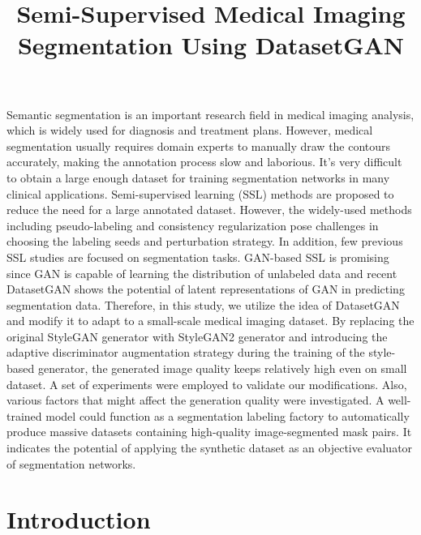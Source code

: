 \documentclass[conference]{IEEEtran}
\title{Semi-Supervised Medical Imaging Segmentation Using DatasetGAN}
\author{\IEEEauthorblockN{Zong Fan}
\IEEEauthorblockA{\textit{Dept. Bioengineering}, UIUC \\
zongfan2@illinois.edu}
}
\begin{document}
\maketitle

\vspace{-0.5cm}
\begin{abstract}
\maketitle

\end{abstract}
Semantic segmentation is an important research field in medical imaging analysis, which is widely used for diagnosis and treatment plans. However, medical segmentation usually requires domain experts to manually draw the contours accurately, making the annotation process slow and laborious. It's very difficult to obtain a large enough dataset for training segmentation networks in many clinical applications.  
Semi-supervised learning (SSL) methods are proposed to reduce the need for a large annotated dataset. However, the widely-used methods including pseudo-labeling and consistency regularization pose challenges in choosing the labeling seeds and perturbation strategy. 
In addition, few previous SSL studies are focused on segmentation tasks. GAN-based SSL is promising since GAN is capable of learning the distribution of unlabeled data and recent DatasetGAN shows the potential of latent representations of GAN in predicting segmentation data. 
Therefore, in this study, we utilize the idea of DatasetGAN and modify it to adapt to a small-scale medical imaging dataset. 
By replacing the original StyleGAN generator with StyleGAN2 generator and introducing the adaptive discriminator augmentation strategy during the training of the style-based generator, the generated image quality keeps relatively high even on small dataset. 
A set of experiments were employed to validate our modifications. Also, various factors that might affect the generation quality were investigated.
A well-trained model could function as a segmentation labeling factory to automatically produce massive datasets containing high-quality image-segmented mask pairs. 
It indicates the potential of applying the synthetic dataset as an objective evaluator of segmentation networks.

\section{Introduction}
\end{document}
